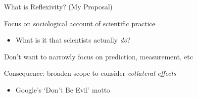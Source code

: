\documentclass[aspectratio=169,xcolor=dvipsnames]{beamer}
\begin{document}









\begin{frame}{What is Reflexivity? (My Proposal)}

Focus on sociological account of scientific practice
\begin{itemize}
    \item What is it that scientists actually \textit{do}?
\end{itemize}

\vspace{5mm}
Don't want to narrowly focus on prediction, measurement, etc

\vspace{5mm}
Consequence: broaden scope to consider \textit{collateral effects}
\begin{itemize}
    \item Google's `Don't Be Evil' motto \autocite{basu2015}
\end{itemize}


\end{frame}

\end{document}

